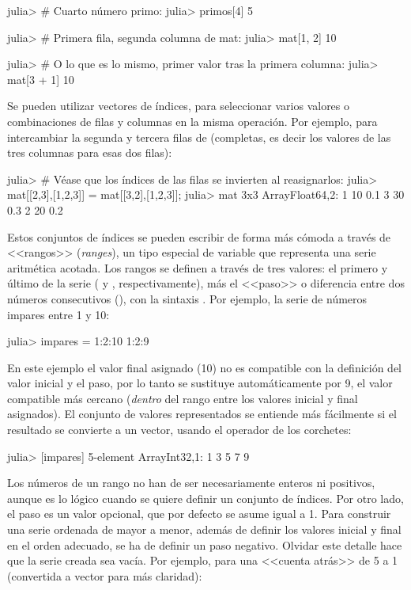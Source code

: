 ﻿\documentclass[spanish]{article}
\begin{document}
julia> \# Cuarto número primo:
julia> primos{[}4{]}
5

julia> \# Primera fila, segunda columna de mat:
julia> mat{[}1, 2{]}
10

julia> \# O lo que es lo mismo, primer valor tras la primera columna:
julia> mat{[}3 + 1{]}
10

Se pueden utilizar vectores de índices, para seleccionar varios valores
o combinaciones de filas y columnas en la misma operación. Por ejemplo,
para intercambiar la segunda y tercera filas de  (completas,
es decir los valores de las tres columnas para esas dos filas):

julia> \# Véase que los índices de las filas se invierten al reasignarlos:
julia> mat{[}{[}2,3{]},{[}1,2,3{]}{]} = mat{[}{[}3,2{]},{[}1,2,3{]}{]};
julia> mat
3x3 Array{Float64,2}:
 1 10 0.1
 3 30 0.3
 2 20 0.2

Estos conjuntos de índices se pueden escribir de forma más cómoda
a través de <<rangos>> (\emph{ranges}), un tipo especial de variable
que representa una serie aritmética acotada. Los rangos se definen
a través de tres valores: el primero y último de la serie (
y , respectivamente), más el <<paso>> o diferencia entre
dos números consecutivos (), con la sintaxis .
Por ejemplo, la serie de números impares entre 1 y 10:

julia> impares = 1:2:10
1:2:9

En este ejemplo el valor final asignado (10) no es compatible con
la definición del valor inicial y el paso, por lo tanto se sustituye
automáticamente por 9, el valor compatible más cercano (\emph{dentro}
del rango entre los valores inicial y final asignados). El conjunto
de valores representados se entiende más fácilmente si el resultado
se convierte a un vector, usando el operador de los corchetes:

julia> {[}impares{]}
5-element Array{Int32,1}:
 1
 3
 5
 7
 9

Los números de un rango no han de ser necesariamente enteros ni positivos,
aunque es lo lógico cuando se quiere definir un conjunto de índices.
Por otro lado, el paso  es un valor opcional, que por defecto
se asume igual a 1. Para construir una serie ordenada de mayor a menor,
además de definir los valores inicial y final en el orden adecuado,
se ha de definir un paso negativo. Olvidar este detalle hace que la
serie creada sea vacía. Por ejemplo, para una <<cuenta atrás>>
de 5 a 1 (convertida a vector para más claridad):
\end{document}
